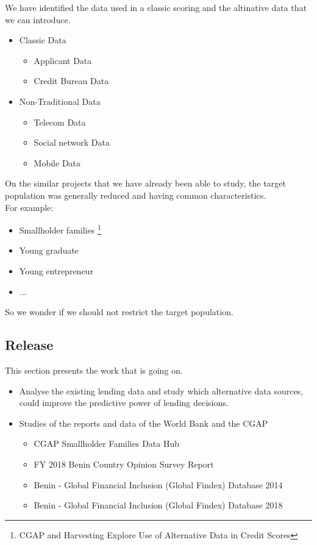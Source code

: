 \documentclass[12pt,a4paper]{amsart}
\numberwithin{equation}{section}
\theoremstyle{plain}
\theoremstyle{definition}
\begin{document}
We have identified the data used in a classic scoring and the altinative data that we can introduce.
\begin{itemize}
   \item Classic Data
   \begin{itemize}
     \item Applicant Data
     \item Credit Bureau Data
   \end{itemize}
   \item Non-Traditional Data
   \begin{itemize}
     \item Telecom Data
     \item Social network Data
     \item Mobile Data     
   \end{itemize}
\end{itemize}

On the similar projects that we have already been able to study, the target population was generally reduced and having common characteristics.\\
For example:
\begin{itemize}
 \item Smallholder families \footnote{CGAP and Harvesting Explore Use of Alternative Data in Credit Scores}
 \item Young graduate
 \item Young entrepreneur
 \item ...
\end{itemize}
So we wonder if we should not restrict the target population.

\subsection{Release}
This section presents the work that is going on.\\
\begin{itemize}
 \item Analyse the existing lending data and study which alternative data sources,
could improve the predictive power of lending decisions.
 \item Studies of the reports and data of the World Bank and the CGAP
\begin{itemize}
 \item CGAP Smallholder Families Data Hub
 \item FY 2018 Benin Country Opinion Survey Report
 \item Benin - Global Financial Inclusion (Global Findex) Database 2014
 \item Benin - Global Financial Inclusion (Global Findex) Database 2018
\end{itemize}

\end{itemize}
\end{document}
